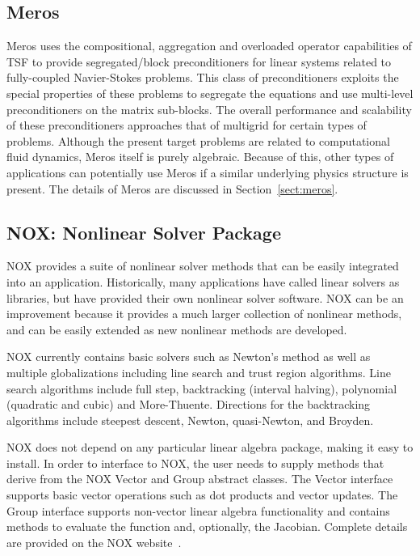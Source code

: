 \documentclass[acmtoms,acmnow]{acmtrans2m}
\begin{document}
\subsection{Meros}

Meros uses the compositional, aggregation and overloaded operator capabilities of
TSF to provide segregated/block preconditioners for linear systems
related to fully-coupled Navier-Stokes problems.  This class of
preconditioners exploits the special properties of these problems to
segregate the equations and use multi-level preconditioners on the
matrix sub-blocks.  The overall performance and scalability of these
preconditioners approaches that of multigrid for certain types of
problems.  Although the present target problems are related to
computational fluid dynamics, Meros itself is purely algebraic.
Because of this, other types of applications can potentially use Meros
if a similar underlying physics structure is present.  The details of
Meros are discussed in Section~\ref{sect:meros}.


\subsection{NOX: Nonlinear Solver Package}

NOX provides a suite of nonlinear solver methods that can be easily
integrated into an application.  Historically, many applications have
called linear solvers as libraries, but have provided their own
nonlinear solver software.  NOX can be an improvement because it
provides a much larger collection of nonlinear methods, and can be
easily extended as new nonlinear methods are developed.

NOX currently contains basic solvers such as Newton's method as well
as multiple globalizations including line search and trust
region algorithms. Line search algorithms include full step,
backtracking (interval halving), polynomial (quadratic and cubic) and
More-Thuente.  Directions for the backtracking algorithms include
steepest descent, Newton, quasi-Newton, and Broyden.

NOX does not depend on any particular linear algebra package, making
it easy to install. In order to interface to NOX, the user needs to
supply methods that derive from the NOX Vector and Group abstract
classes.  The Vector interface supports basic vector operations such
as dot products and vector updates. The Group interface supports
non-vector linear algebra functionality and contains methods to
evaluate the function and, optionally, the Jacobian.  Complete details
are provided on the NOX website~\cite{NOX-home-page}.
\end{document}
